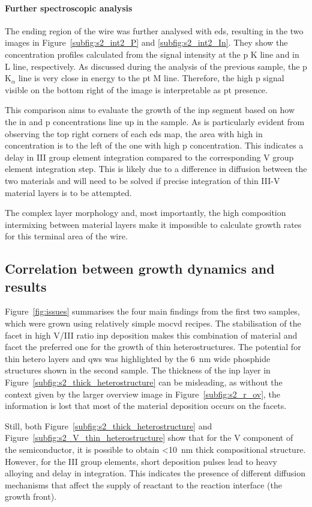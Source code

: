 \paragraph{Further spectroscopic analysis} The ending region of the wire was further analysed with \acs{eds}, resulting in the two images in Figure~\ref{subfig:s2_int2_P} and \ref{subfig:s2_int2_In}. They show the concentration profiles calculated from the signal intensity at the \acl{p} K line and \acl{in} L line, respectively. As discussed during the analysis of the previous sample, the \acl{p} K\(_\alpha\) line is very close in energy to the \acl{pt} M line. Therefore, the high \acl{p} signal visible on the bottom right of the image is interpretable as \acl{pt} presence. 

This comparison aims to evaluate the growth of the \acs{inp} segment based on how the \acl{in} and \acl{p} concentrations line up in the sample. As is particularly evident from observing the top right corners of each \acs{eds} map, the area with high \acl{in} concentration is to the left of the one with high \acl{p} concentration. This indicates a delay in III group element integration compared to the corresponding V group element integration step. This is likely due to a difference in diffusion between the two materials and will need to be solved if precise integration of thin III-V material layers is to be attempted.

The complex layer morphology and, most importantly, the high composition intermixing between material layers make it impossible to calculate growth rates for this terminal area of the wire.

\subsection{Correlation between growth dynamics and results}
Figure~\ref{fig:issues} summarises the four main findings from the first two samples, which were grown using relatively simple \acs{mocvd} recipes. The stabilisation of the  facet in high V/III ratio \acs{inp} deposition makes this combination of material and facet the preferred one for the growth of thin heterostructures. The potential for thin hetero layers and \acl{qw}s was highlighted by the \qty{6}{\nano\metre} wide phosphide structures shown in the second sample. The thickness of the \acs{inp} layer in Figure~\ref{subfig:s2_thick_heterostructure} can be misleading, as without the context given by the larger overview image in Figure~\ref{subfig:s2_r_ov}, the information is lost that most of the material deposition occurs on the  facets. 
\par
Still, both Figure~\ref{subfig:s2_thick_heterostructure} and Figure~\ref{subfig:s2_V_thin_heterostructure} show that for the V component of the semiconductor, it is possible to obtain <\qty{10}{\nano\metre} thick compositional structure. However, for the III group elements, short deposition pulses lead to heavy alloying and delay in integration. This indicates the presence of different diffusion mechanisms that affect the supply of reactant to the reaction interface (the growth front). 


